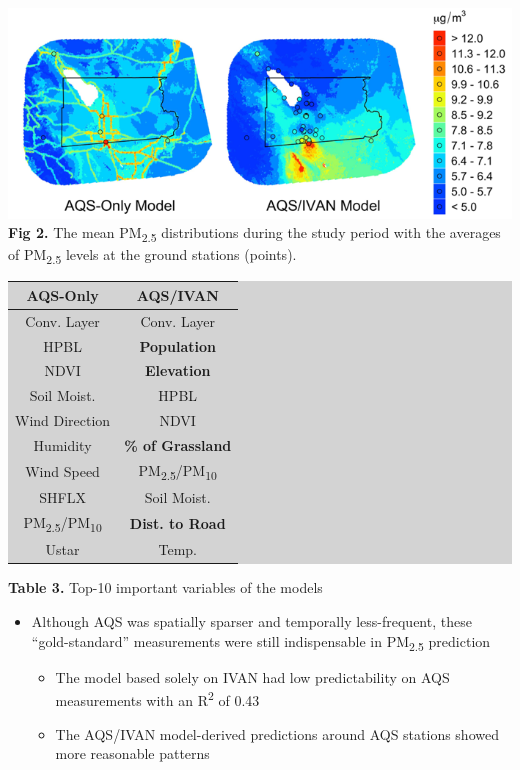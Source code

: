 \documentclass[a0paper,portrait]{baposter}
\newcommand{\tsub}{\textsubscript}
\newcommand{\tup}{\textsuperscript}
\begin{document}
\begin{poster}
{\begin{minipage}{0.67\textwidth}
\includegraphics[width=\textwidth]{dist.png}
\textbf{Fig 2.} The mean PM\tsub{2.5} distributions during the study period with the averages of PM\tsub{2.5} levels at the ground stations (points).
\end{minipage}
\begin{minipage}{0.31\textwidth}
{\renewcommand{\arraystretch}{1.1}%
\begin{threeparttable}
\footnotesize
\begingroup\setlength{\fboxsep}{0pt}
\colorbox{lightgray}{%
\begin{tabular}{cc}
\toprule
\textbf{AQS-Only}       & \textbf{AQS/IVAN}        \\
\midrule
Conv. Layer    & Conv. Layer     \\
HPBL           & \textbf{Population}      \\
NDVI           & \textbf{Elevation}       \\
Soil Moist.    & HPBL            \\
Wind Direction & NDVI            \\
Humidity       & \textbf{\% of Grassland} \\
Wind Speed     & PM\tsub{2.5}/PM\tsub{10}      \\
SHFLX          & Soil Moist.     \\
PM\tsub{2.5}/PM\tsub{10}     & \textbf{Dist. to Road}   \\
Ustar          & Temp.            \\
\bottomrule
\end{tabular}
}\endgroup
\end{threeparttable}
\textbf{Table 3.} Top-10 important variables of the models
}
\end{minipage}

\vspace{0.5\baselineskip}

\begin{itemize}
    \item Although AQS was spatially sparser and temporally less-frequent, these ``gold-standard'' measurements were still indispensable in PM\tsub{2.5} prediction
    \begin{itemize}
        \item The model based solely on IVAN had low predictability on AQS measurements with an R\tup{2} of 0.43
        \item The AQS/IVAN model-derived predictions around AQS stations showed more reasonable patterns
    \end{itemize}
\end{itemize}

}
\end{poster}
\end{document}
